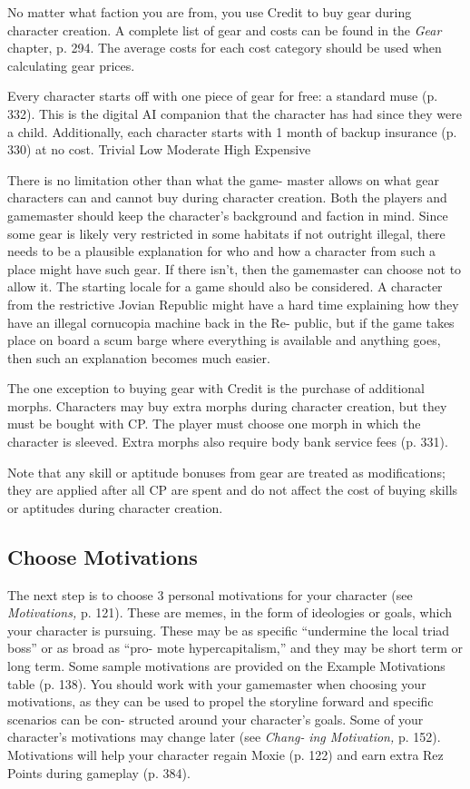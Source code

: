 No matter what faction you are from, you use Credit 
to buy gear during character creation. A complete list 
of gear and costs can be found in the \textit{Gear} chapter, p. 
294. The average costs for each cost category should 
be used when calculating gear prices.

Every character starts off with one piece of gear 
for free: a standard muse (p. 332). This is the digital 
AI companion that the character has had since they 
were a child. Additionally, each character starts with 1 
month of backup insurance (p. 330) at no cost.
Trivial
Low
Moderate
High
Expensive

There is no limitation other than what the game-
master allows on what gear characters can and cannot 
buy during character creation. Both the players and 
gamemaster should keep the character's background 
and faction in mind. Since some gear is likely very 
restricted in some habitats if not outright illegal, there 
needs to be a plausible explanation for who and how 
a character from such a place might have such gear. 
If there isn't, then the gamemaster can choose not to 
allow it. The starting locale for a game should also 
be considered. A character from the restrictive Jovian 
Republic might have a hard time explaining how they 
have an illegal cornucopia machine back in the Re-
public, but if the game takes place on board a scum 
barge where everything is available and anything goes, 
then such an explanation becomes much easier.

The one exception to buying gear with Credit is 
the purchase of additional morphs. Characters may 
buy extra morphs during character creation, but they 
must be bought with CP. The player must choose 
one morph in which the character is sleeved. Extra 
morphs also require body bank service fees (p. 331).

Note that any skill or aptitude bonuses from gear 
are treated as modifications; they are applied after 
all CP are spent and do not affect the cost of buying 
skills or aptitudes during character creation.

\subsection{Choose Motivations}

The next step is to choose 3 personal motivations 
for your character (see \textit{Motivations,} p. 121). These 
are memes, in the form of ideologies or goals, which 
your character is pursuing. These may be as specific 
``undermine the local triad boss'' or as broad as ``pro-
mote hypercapitalism,'' and they may be short term 
or long term. Some sample motivations are provided 
on the Example Motivations table (p. 138). You 
should work with your gamemaster when choosing 
your motivations, as they can be used to propel the 
storyline forward and specific scenarios can be con-
structed around your character's goals. Some of your 
character's motivations may change later (see \textit{Chang-}
\textit{ing Motivation,} p. 152). Motivations will help your 
character regain Moxie (p. 122) and earn extra Rez 
Points during gameplay (p. 384).

